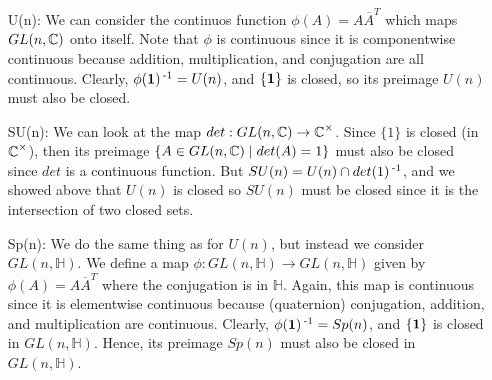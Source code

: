 \documentclass[12pt,onecolumn]{article}
\begin{document}
\begin{answer}
\begin{itemize}
    \item[U(n):] We can consider the continuos function $\phi(A) = A\overline{A}^T$ which maps $GL(n,\operatorname{\mathbb{C}})$ onto itself. Note that $\phi$ is continuous since it is componentwise continuous because addition, multiplication, and conjugation are all continuous. Clearly, $\phi(\operatorname{\mathbf{1}})\operatorname{^{-1}} = U(n)$, and $\{\operatorname{\mathbf{1}}\}$ is closed, so its preimage $U(n)$ must also be closed.
    \item[SU(n):] We can look at the map $det : GL(n,\operatorname{\mathbb{C}}) \rightarrow \operatorname{\mathbb{C}}^{\times}$. Since $\{1\} $ is closed (in $\operatorname{\mathbb{C}}^{\times}$), then its preimage $\{A \in GL(n,\operatorname{\mathbb{C}}) \mid det(A)=1\}$ must also be closed since $det$ is a continuous function. But $SU(n) = U(n) \cap det(1)\operatorname{^{-1}}$, and we showed above that $U(n)$ is closed so $SU(n)$ must be closed since it is the intersection of two closed sets.
    \item[Sp(n):] We do the same thing as for $U(n)$, but instead we consider $GL(n,\mathbb{H})$. We define a map $\phi : GL(n,\mathbb{H}) \rightarrow GL(n,\mathbb{H})$ given by $\phi(A) = A\overline{A}^T$ where the conjugation is in $\mathbb{H}$. Again, this map is continuous since it is elementwise continuous because (quaternion) conjugation, addition, and multiplication are continuous. Clearly, $\phi(\operatorname{\mathbf{1}})\operatorname{^{-1}} = Sp(n)$, and $\{\operatorname{\mathbf{1}}\}$ is closed in $GL(n,\mathbb{H})$. Hence, its preimage $Sp(n)$ must also be closed in $GL(n,\mathbb{H})$.
\end{itemize}
\end{answer}
\end{document}
